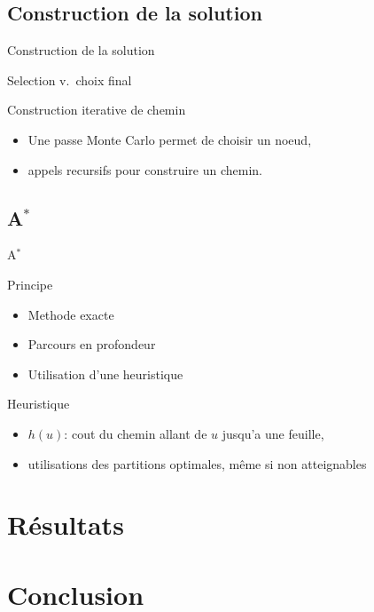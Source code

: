 \documentclass[tikz]{beamer}
\begin{document}
\subsection{Construction de la solution}
\begin{frame}[c]{Construction de la solution}
  \begin{block}{Selection v.\ choix final}
  \end{block}
  \begin{block}{Construction iterative de chemin}
    \begin{itemize}
      \item Une passe Monte Carlo permet de choisir un noeud,
      \item appels recursifs pour construire un chemin.
    \end{itemize}
  \end{block}
\end{frame}

\subsection{A\(^*\)}
\begin{frame}[c]{A\(^*\)}
  \begin{block}{Principe}
    \begin{itemize}
      \item Methode exacte
      \item Parcours en profondeur
      \item Utilisation d'une heuristique
    \end{itemize}
  \end{block}
  \begin{block}{Heuristique}
    \begin{itemize}
      \item \(h(u)\): cout du chemin allant de \(u\) jusqu'a une feuille,
      \item utilisations des partitions optimales, même si non atteignables
    \end{itemize}
  \end{block}
\end{frame}

\section{Résultats}

\section*{Conclusion}
\end{document}
